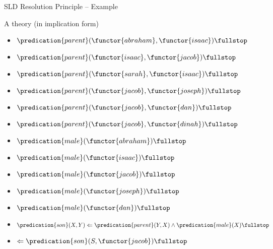\documentclass[presentation]{beamer}\mode<presentation>{\usetheme{AMSBolognaFC}}
\begin{document}
\begin{frame}[allowframebreaks]{SLD Resolution Principle -- Example}
    \begin{block}{A theory (in implication form)}
        \begin{multicols}{2}
            \begin{itemize}
                \item $\predication{parent}(\functor{abraham}, \functor{isaac}) \fullstop$
                \item $\predication{parent}(\functor{isaac}, \functor{jacob}) \fullstop$
                \item $\predication{parent}(\functor{sarah}, \functor{isaac}) \fullstop$
                \item $\predication{parent}(\functor{jacob}, \functor{joseph}) \fullstop$
                \item $\predication{parent}(\functor{jacob}, \functor{dan}) \fullstop$
                \item $\predication{parent}(\functor{jacob}, \functor{dinah}) \fullstop$
                \item $\predication{male}(\functor{abraham}) \fullstop$
                \item $\predication{male}(\functor{isaac}) \fullstop$
                \item $\predication{male}(\functor{jacob}) \fullstop$
                \item $\predication{male}(\functor{joseph}) \fullstop$
                \item $\predication{male}(\functor{dan}) \fullstop$
            \end{itemize}
        \end{multicols}
        \begin{itemize}
            \item $\predication{son}(X, Y) \Leftarrow \predication{parent}(Y, X) \wedge \predication{male}(X) \fullstop$
            \item $\Leftarrow \predication{son}(S, \functor{jacob}) \fullstop$
        \end{itemize}
    \end{block}
\end{frame}
\end{document}
